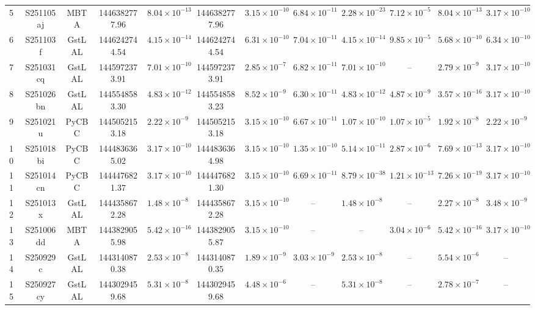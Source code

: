 \begin{table}[ht]
{\begin{tabular}{!{\vrule width 1pt}lccccccccccc!{\vrule width 1pt}}
5 & S251105aj & MBTA & 1446382777.96 & $8.04 \times 10^{-13}$ & 1446382777.96 & $3.15 \times 10^{-10}$ & $6.84 \times 10^{-11}$ & $2.28 \times 10^{-23}$ & $7.12 \times 10^{-5}$ & $8.04 \times 10^{-13}$ & $3.17 \times 10^{-10}$ \\
6 & S251103f & GstLAL & 1446242744.54 & $4.15 \times 10^{-14}$ & 1446242744.54 & $6.31 \times 10^{-10}$ & $7.04 \times 10^{-11}$ & $4.15 \times 10^{-14}$ & $9.85 \times 10^{-5}$ & $5.68 \times 10^{-10}$ & $6.34 \times 10^{-10}$ \\
7 & S251031cq & GstLAL & 1445972373.91 & $7.01 \times 10^{-10}$ & 1445972373.91 & $2.85 \times 10^{-7}$ & $6.82 \times 10^{-11}$ & $7.01 \times 10^{-10}$ & -- & $2.79 \times 10^{-9}$ & $3.17 \times 10^{-10}$ \\
8 & S251026bn & GstLAL & 1445548583.30 & $4.83 \times 10^{-12}$ & 1445548583.23 & $8.52 \times 10^{-9}$ & $6.30 \times 10^{-11}$ & $4.83 \times 10^{-12}$ & $4.87 \times 10^{-9}$ & $3.57 \times 10^{-16}$ & $3.17 \times 10^{-10}$ \\
9 & S251021u & PyCBC & 1445052153.18 & $2.22 \times 10^{-9}$ & 1445052153.18 & $3.15 \times 10^{-10}$ & $6.67 \times 10^{-11}$ & $1.07 \times 10^{-10}$ & $1.07 \times 10^{-5}$ & $1.92 \times 10^{-8}$ & $2.22 \times 10^{-9}$ \\
10 & S251018bi & PyCBC & 1444836365.02 & $3.17 \times 10^{-10}$ & 1444836364.98 & $3.15 \times 10^{-10}$ & $1.35 \times 10^{-10}$ & $5.14 \times 10^{-11}$ & $2.87 \times 10^{-6}$ & $7.69 \times 10^{-13}$ & $3.17 \times 10^{-10}$ \\
11 & S251014cn & PyCBC & 1444476821.37 & $3.17 \times 10^{-10}$ & 1444476821.30 & $3.15 \times 10^{-10}$ & $6.69 \times 10^{-11}$ & $8.79 \times 10^{-38}$ & $1.21 \times 10^{-13}$ & $7.26 \times 10^{-19}$ & $3.17 \times 10^{-10}$ \\
12 & S251013x & GstLAL & 1444358672.28 & $1.48 \times 10^{-8}$ & 1444358672.28 & $3.15 \times 10^{-10}$ & -- & $1.48 \times 10^{-8}$ & -- & $2.27 \times 10^{-8}$ & $3.48 \times 10^{-9}$ \\
13 & S251006dd & MBTA & 1443829055.98 & $5.42 \times 10^{-16}$ & 1443829055.87 & $3.15 \times 10^{-10}$ & -- & -- & $3.04 \times 10^{-6}$ & $5.42 \times 10^{-16}$ & $3.17 \times 10^{-10}$ \\
14 & S250929c & GstLAL & 1443140870.38 & $2.53 \times 10^{-8}$ & 1443140870.35 & $1.89 \times 10^{-9}$ & $3.03 \times 10^{-9}$ & $2.53 \times 10^{-8}$ & -- & $5.54 \times 10^{-6}$ & -- \\
15 & S250927cy & GstLAL & 1443029459.68 & $5.31 \times 10^{-8}$ & 1443029459.68 & $4.48 \times 10^{-6}$ & -- & $5.31 \times 10^{-8}$ & -- & $2.78 \times 10^{-7}$ & -- \\

\end{tabular}}
\end{table}
